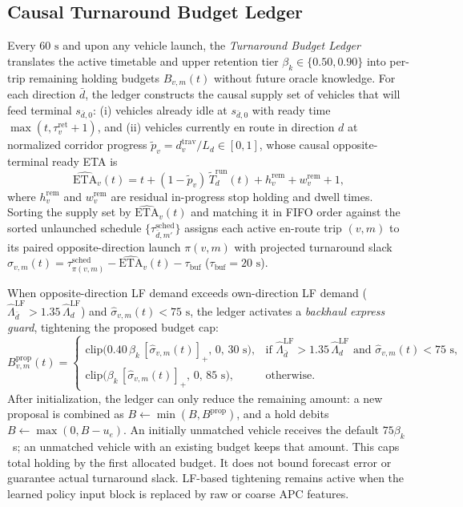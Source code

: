 \subsection{Causal Turnaround Budget Ledger}
\label{sec:method_ledger}

Every $60\text{ s}$ and upon any vehicle launch, the \emph{Turnaround Budget Ledger} translates the active timetable and upper retention tier $\beta_k \in \{0.50, 0.90\}$ into per-trip remaining holding budgets $B_{v,m}(t)$ without future oracle knowledge. For each direction $\bar{d}$, the ledger constructs the causal supply set of vehicles that will feed terminal $s_{\bar{d},0}$: (i) vehicles already idle at $s_{\bar{d},0}$ with ready time $\max(t, \tau^{\mathrm{ret}}_v + 1)$, and (ii) vehicles currently en route in direction $d$ at normalized corridor progress $\tilde{p}_v = d^{\mathrm{trav}}_v / L_d \in [0, 1]$, whose causal opposite-terminal ready ETA is
\begin{equation}
  \widehat{\mathrm{ETA}}_v(t) = t + (1 - \tilde{p}_v)\,\tilde{T}^{\mathrm{run}}_d(t) + h^{\mathrm{rem}}_v + w^{\mathrm{rem}}_v + 1,
  \label{eq:ledger_eta}
\end{equation}
where $h^{\mathrm{rem}}_v$ and $w^{\mathrm{rem}}_v$ are residual in-progress stop holding and dwell times. Sorting the supply set by $\widehat{\mathrm{ETA}}_v(t)$ and matching it in FIFO order against the sorted unlaunched schedule $\{\tau^{\mathrm{sched}}_{\bar{d},m'}\}$ assigns each active en-route trip $(v,m)$ to its paired opposite-direction launch $\pi(v,m)$ with projected turnaround slack $\hat{\sigma}_{v,m}(t) = \tau^{\mathrm{sched}}_{\pi(v,m)} - \widehat{\mathrm{ETA}}_v(t) - \tau_{\mathrm{buf}}$ ($\tau_{\mathrm{buf}} = 20\text{ s}$).

When opposite-direction LF demand exceeds own-direction LF demand ($\hat{\Lambda}^{\mathrm{LF}}_{\bar{d}} > 1.35\,\hat{\Lambda}^{\mathrm{LF}}_d$) and $\hat{\sigma}_{v,m}(t) < 75\text{ s}$, the ledger activates a \emph{backhaul express guard}, tightening the proposed budget cap:
\begin{equation}
  B^{\mathrm{prop}}_{v,m}(t) =
  \begin{cases}
    \mathrm{clip}\bigl(0.40\,\beta_k\,[\hat{\sigma}_{v,m}(t)]_+,\, 0,\, 30\text{ s}\bigr), & \text{if } \hat{\Lambda}^{\mathrm{LF}}_{\bar{d}} > 1.35\,\hat{\Lambda}^{\mathrm{LF}}_d \text{ and } \hat{\sigma}_{v,m}(t) < 75\text{ s}, \\
    \mathrm{clip}\bigl(\beta_k\,[\hat{\sigma}_{v,m}(t)]_+,\, 0,\, 85\text{ s}\bigr), & \text{otherwise}.
  \end{cases}
  \label{eq:budget_proposal}
\end{equation}
After initialization, the ledger can only reduce the remaining amount: a new proposal is combined as $B\leftarrow\min(B,B^{\mathrm{prop}})$, and a hold debits $B\leftarrow\max(0,B-u_e)$. An initially unmatched vehicle receives the default $75\beta_k$~s; an unmatched vehicle with an existing budget keeps that amount. This caps total holding by the first allocated budget. It does not bound forecast error or guarantee actual turnaround slack. LF-based tightening remains active when the learned policy input block is replaced by raw or coarse APC features.

